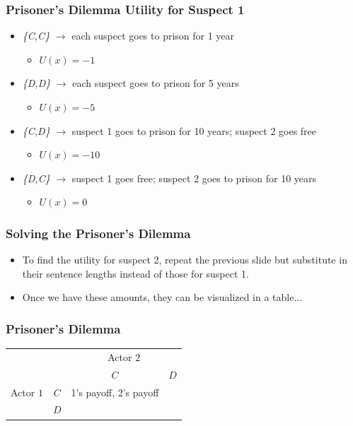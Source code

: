 \documentclass[handout]{beamer}
\begin{document}
 \begin{frame} 
	\frametitle{\LARGE{Prisoner's Dilemma Utility for Suspect 1}}
	\begin{itemize}
		\item \emph{\{C,C\}} $\rightarrow$ \pause each suspect goes to prison for 1 year \pause \begin{itemize}
			\item $U(x) = -1$
		\end{itemize}
		\item \emph{\{D,D\}} $\rightarrow$ \pause each suspect goes to prison for 5 years \pause 
		\begin{itemize}
			\item $U(x) = -5$
		\end{itemize}
		\item \emph{\{C,D\}} $\rightarrow$ \pause suspect 1 goes to prison for 10 years; suspect 2 goes free  \pause 
		\begin{itemize}
			\item $U(x) = -10$
		\end{itemize}
		\item \emph{\{D,C\}} $\rightarrow$ \pause suspect 1 goes free; suspect 2 goes to prison for 10 years \pause
		\begin{itemize}
			\item $U(x) = 0$
		\end{itemize}
	\end{itemize}
\end{frame}

\begin{frame} 
	\frametitle{\LARGE{Solving the Prisoner's Dilemma}}
	\begin{itemize}
		\item To find the utility for suspect 2, repeat the previous slide but substitute in their sentence lengths instead of those for suspect 1. \pause
		\item Once we have these amounts, they can be visualized in a table...
	\end{itemize}
\end{frame}

\begin{frame} 
 \frametitle{\LARGE{Prisoner's Dilemma}}
  \begin{table}
  	\LARGE
 	\begin{tabular}{cc|c|c|}
 		& \multicolumn{1}{c}{} & \multicolumn{2}{c}{Actor $2$}\\
 		& \multicolumn{1}{c}{} & \multicolumn{1}{c}{$C$}  & \multicolumn{1}{c}{$D$} \\\cline{3-4}
 		{Actor $1$}  & $C$  & 1's payoff, 2's payoff  &  \\\cline{3-4}
 		&  $D$ &  &  \\\cline{3-4}
 	\end{tabular}
 \end{table}
 \end{frame}
\end{document}
